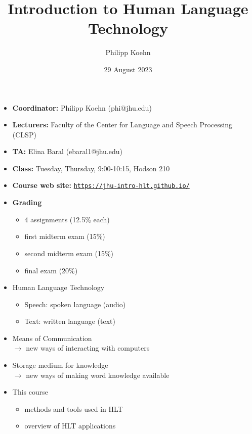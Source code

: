 \documentclass[landscape]{jhuslides3C}
\begin{document}
\rm
\title[Introduction to Human Language Technology: Introduction]{Introduction to Human Language Technology}
\author[Philipp Koehn]{Philipp Koehn}
\date{29 August 2023}
\maketitle


\vfill
\begin{itemize} \itemsep 0mm
\item \textbf{Coordinator:} Philipp Koehn (phi@jhu.edu)
\item \textbf{Lecturers:} Faculty of the Center for Language and Speech Processing (CLSP)
\item \textbf{TA:} Elina Baral (ebaral1@jhu.edu)
\item \textbf{Class:} Tuesday, Thursday, 9:00-10:15, Hodson 210
\item \textbf{Course web site:} \href{https://jhu-intro-hlt.github.io/}{\tt https://jhu-intro-hlt.github.io/}
\item \textbf{Grading} \vspace{-3mm}
\begin{itemize}
\item 4 assignments (12.5\% each)
\item first midterm exam (15\%)
\item second midterm exam (15\%)
\item final exam (20\%)
\end{itemize}
\end{itemize}
\vfill


\vfill
\begin{itemize}
\item Human Language Technology
\begin{itemize}
\item Speech: spoken language (audio)
\item Text: written language (text)
\end{itemize}
\item Means of Communication\\
$\rightarrow$ new ways of interacting with computers
\item Storage medium for knowledge\\
$\rightarrow$ new ways of making word knowledge available
\item This course
\begin{itemize}
\item methods and tools used in HLT
\item overview of HLT applications
\end{itemize}
\end{itemize}
\vfill
\end{document}
